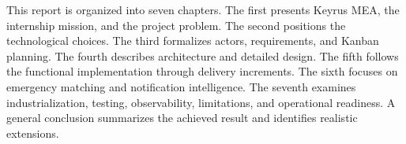 This report is organized into seven chapters. The first presents Keyrus MEA, the internship mission, and the project problem. The second positions the technological choices. The third formalizes actors, requirements, and Kanban planning. The fourth describes architecture and detailed design. The fifth follows the functional implementation through delivery increments. The sixth focuses on emergency matching and notification intelligence. The seventh examines industrialization, testing, observability, limitations, and operational readiness.
A general conclusion summarizes the achieved result and identifies realistic extensions.

